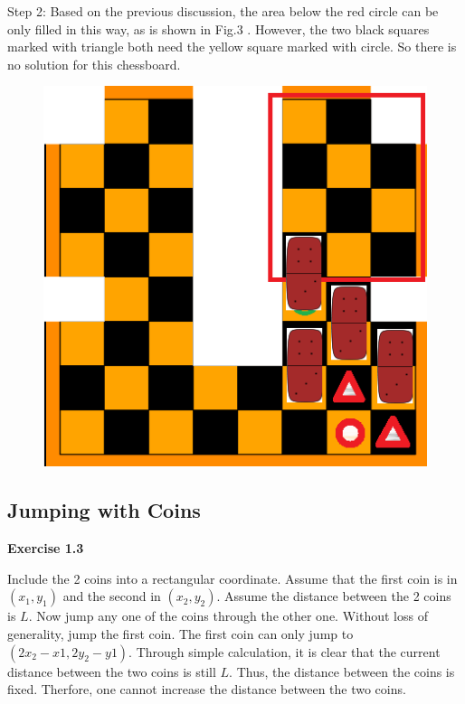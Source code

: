 \documentclass{article} %
\begin{document}
	Step 2: Based on the previous discussion, the area below the red circle can be only filled in this way, as is shown in Fig.3 . However, the two black squares marked with triangle both need the yellow square marked with circle. So there is no solution for this chessboard.
	\begin{figure}[H]
		\centering
		\includegraphics[scale=0.6]{f2.png}
		\caption{}
		\label{fig:3}
	\end{figure}
	
	\subsection{Jumping with Coins}
	\textbf{Exercise 1.3}\par
	Include the 2 coins into a rectangular coordinate. Assume that the first coin is in $(x_1,y_1)$ and the second in $(x_2,y_2)$. Assume the distance between the 2 coins is $L$. Now jump any one of the coins through the other one. Without loss of generality, jump the first coin. The first coin can only jump to $(2x_2-x1,2y_2-y1)$. Through simple calculation, it is clear that the current distance between the two coins is still $L$. Thus, the distance between the coins is fixed. Therfore, one cannot increase the distance between the two coins. \\
	
\end{document}
